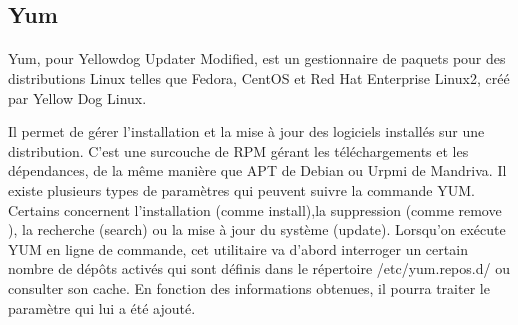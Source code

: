 \documentclass[a4paper,12pt]{article}
\begin{document}
\subsection{Yum}
\paragraph{}
Yum, pour Yellowdog Updater Modified, est un gestionnaire de paquets pour des distributions Linux telles que Fedora, CentOS et Red Hat Enterprise Linux2, créé par Yellow Dog Linux.

Il permet de gérer l'installation et la mise à jour des logiciels installés sur une distribution. C'est une surcouche de RPM gérant les téléchargements et les dépendances, de la même manière que APT de Debian ou Urpmi de Mandriva.
Il existe plusieurs types de paramètres qui peuvent suivre la commande YUM. Certains concernent l'installation (comme install),la suppression (comme remove ), la recherche (search) ou la mise à jour du système (update). Lorsqu'on exécute YUM 
en ligne de commande, cet utilitaire va d'abord interroger un certain nombre de dépôts activés qui sont définis dans le répertoire /etc/yum.repos.d/ ou consulter son cache. En fonction des informations obtenues, il pourra traiter le paramètre qui lui a été ajouté.
\end{document}
